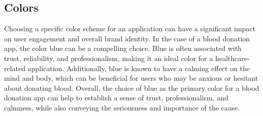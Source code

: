 \subsection{Colors }
Choosing a specific color scheme for an application can have a significant impact on user engagement and overall brand identity. In the case of a blood donation app, the color blue can be a compelling choice. Blue is often associated with trust, reliability, and professionalism, making it an ideal color for a healthcare-related application. Additionally, blue is known to have a calming effect on the mind and body, which can be beneficial for users who may be anxious or hesitant about donating blood. Overall, the choice of blue as the primary color for a blood donation app can help to establish a sense of trust, professionalism, and calmness, while also conveying the seriousness and importance of the cause.



